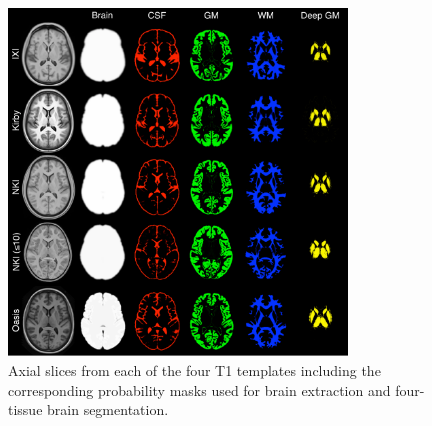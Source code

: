\begin{figure}
  \centering
  \includegraphics[width=90mm]{Figures/templateProbabilityMasks.pdf}
  \caption{Axial slices from each of the four T1 templates including the corresponding
  probability masks used for brain extraction and four-tissue brain segmentation.  
  }
  \label{fig:templateMasks}
\end{figure}


